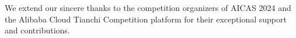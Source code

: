 \documentclass[conference]{IEEEtran}
\begin{document}
We extend our sincere thanks to the competition organizers of AICAS 2024 and the Alibaba Cloud Tianchi Competition platform for their exceptional support and contributions.

%
%







\end{document}
